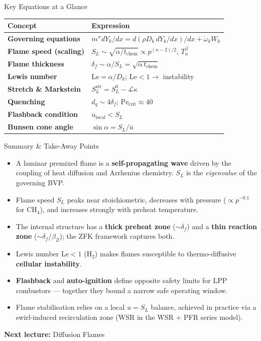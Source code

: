 \documentclass[12pt,aspectratio=169]{beamer}
\newcommand{\Le}{\mathrm{Le}}
\newcommand{\Pe}{\mathrm{Pe}}
\newcommand{\mdot}{\dot{m}}
\newcommand{\wdot}{\dot{\omega}}
\newcommand{\SL}{S_L}
\newcommand{\lf}{\delta_f}
\newcommand{\tchem}{t_{\text{chem}}}
\newcommand{\alphath}{\alpha}
\begin{document}
\begin{frame}{Key Equations at a Glance}
  \renewcommand{\arraystretch}{1.6}
  \begin{tabular}{>{\bfseries}p{4.0cm} p{7.5cm}}
    \toprule
    Concept & Expression \\
    \midrule
    Governing equations & $\mdot'' dY_k/dx = d(\rho D_k\,dY_k/dx)/dx
                          + \wdot_k W_k$ \\
    Flame speed (scaling) & $\SL \sim \sqrt{\alphath/\tchem}
                            \propto p^{(n-2)/2}$, $T_u^\beta$ \\
    Flame thickness & $\lf \sim \alphath/\SL = \sqrt{\alphath\,\tchem}$ \\
    Lewis number & $\Le = \alphath/D_k$; $\Le<1 \to$ instability \\
    Stretch \& Markstein & $\SL^{\text{str}} = \SL^0 - \mathcal{L}\kappa$ \\
    Quenching & $d_q \sim 4\lf$; $\Pe_{\text{crit}} \approx 40$ \\
    Flashback condition & $u_{\text{local}} < \SL$ \\
    Bunsen cone angle & $\sin\alpha = \SL/\bar{u}$ \\
    \bottomrule
  \end{tabular}
\end{frame}

\begin{frame}{Summary \& Take-Away Points}
  \begin{itemize}
    \item A laminar premixed flame is a \textbf{self-propagating
          wave} driven by the coupling of heat diffusion and
          Arrhenius chemistry.
          $\SL$ is the \emph{eigenvalue} of the governing BVP.
    \item Flame speed $\SL$ peaks near stoichiometric, decreases
          with pressure ($\propto p^{-0.1}$ for CH$_4$), and
          increases strongly with preheat temperature.
    \item The internal structure has a \textbf{thick preheat zone}
          ($\sim\lf$) and a \textbf{thin reaction zone}
          ($\sim\lf/\beta_Z$); the ZFK framework captures both.
    \item Lewis number $\Le < 1$ (H$_2$) makes flames susceptible to
          thermo-diffusive \textbf{cellular instability}.
    \item \textbf{Flashback} and \textbf{auto-ignition} define
          opposite safety limits for LPP combustors ---
          together they bound a narrow safe operating window.
    \item Flame stabilisation relies on a local $u = \SL$ balance,
          achieved in practice via a swirl-induced recirculation zone
          (WSR in the WSR + PFR series model).
  \end{itemize}
  \vfill
  \begin{center}
    \large\textbf{Next lecture:} Diffusion Flames 
  \end{center}
\end{frame}
\end{document}
